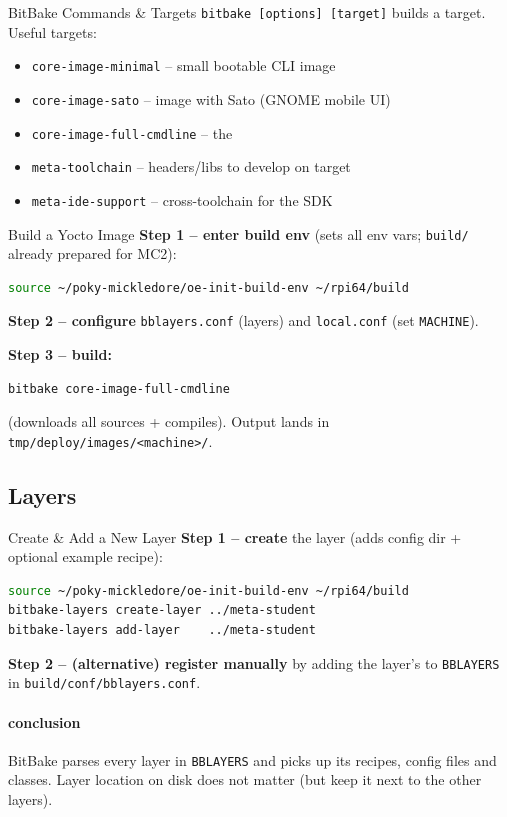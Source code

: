 \begin{definition}{BitBake Commands \& Targets}
    \texttt{bitbake [options] [target]} builds a target.
    Useful targets:
    \begin{itemize}
        \item \texttt{core-image-minimal} -- small bootable CLI image
        \item \texttt{core-image-sato} -- image with Sato (GNOME mobile UI)
        \item \texttt{core-image-full-cmdline} -- the 
        \item \texttt{meta-toolchain} -- headers/libs to develop on target
        \item \texttt{meta-ide-support} -- cross-toolchain for the SDK
    \end{itemize}
\end{definition}

\begin{KR}{Build a Yocto Image}
    \textbf{Step 1 -- enter build env} (sets all env vars; \texttt{build/} already
    prepared for MC2):
\begin{lstlisting}[language=bash, style=basesmol, aboveskip=2pt, belowskip=2pt]
source ~/poky-mickledore/oe-init-build-env ~/rpi64/build
\end{lstlisting}
    \textbf{Step 2 -- configure} \texttt{bblayers.conf} (layers) and
    \texttt{local.conf} (set \texttt{MACHINE}).

    \textbf{Step 3 -- build:}
\begin{lstlisting}[language=bash, style=basesmol, aboveskip=2pt, belowskip=2pt]
bitbake core-image-full-cmdline
\end{lstlisting}
     (downloads all sources + compiles).
    Output lands in \texttt{tmp/deploy/images/<machine>/}.
\end{KR}

\subsection{Layers}

\begin{KR}{Create \& Add a New Layer}
    \textbf{Step 1 -- create} the layer (adds config dir + optional example recipe):
\begin{lstlisting}[language=bash, style=basesmol, aboveskip=2pt, belowskip=2pt]
source ~/poky-mickledore/oe-init-build-env ~/rpi64/build
bitbake-layers create-layer ../meta-student
bitbake-layers add-layer    ../meta-student
\end{lstlisting}
    \textbf{Step 2 -- (alternative) register manually} by adding the layer's
     to \texttt{BBLAYERS} in \texttt{build/conf/bblayers.conf}.

    \paragraph{conclusion}
    BitBake parses every layer in \texttt{BBLAYERS} and picks up its recipes,
    config files and classes. Layer location on disk does not matter (but keep
    it next to the other layers).
\end{KR}

